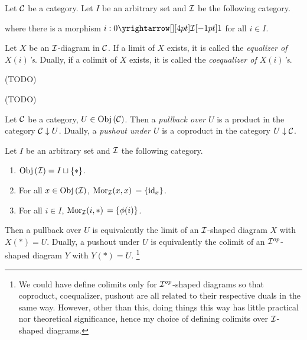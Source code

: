 \begin{dfn}[(Co)Equalizers]
  
  Let $\mathcal{C}$ be a category. 
  Let $I$ be an arbitrary set and $\mathcal{I}$ be the following category. 
  \begin{figure}[H]
    \centering
  \end{figure}
  where there is a morphism $i : \map{0}{1}{\II}{}$ for all $i \in I$. 

  Let $X$ be an $\mathcal{I}$-diagram in $\mathcal{C}$. 
  If a limit of $X$ exists, 
  it is called the \emph{equalizer of $X(i)$'s}. 
  Dually, if a colimit of $X$ exists, 
  it is called the \emph{coequalizer of $X(i)$'s}.
\end{dfn}

\begin{eg}[Equalizers]
  
  (TODO)
\end{eg}

\begin{eg}[Coequalizers]
  
  (TODO)
\end{eg}

\begin{dfn}
  
  Let $\mathcal{C}$ be a category, $U \in \mathrm{Obj}\left(\mathcal{C}\right)$.
  Then a \emph{pullback over $U$} is a product in the 
  category $\mathcal{C}\downarrow U$.
  Dually, a \emph{pushout under $U$} is a coproduct in the 
  category $U\downarrow \mathcal{C}$.

  Let $I$ be an arbitrary set and $\mathcal{I}$ the following category. 
  \begin{figure}[H]
    \centering
  \end{figure}
  \begin{enumerate}
    \item $\mathrm{Obj}\left(\mathcal{I}\right) = I \sqcup \left\{*\right\}$.
    \item For all $x \in \mathrm{Obj}\left(\mathcal{I}\right)$, $\mathrm{Mor}_{\mathcal{I}}(x, x)\, = \left\{\mathrm{id}_{x}\right\}$.
    \item For all $i \in I$, $\mathrm{Mor}_{\mathcal{I}}(i, *)\, = \left\{\phi(i)\right\}$.
  \end{enumerate}
  Then a pullback over $U$ is equivalently the limit of 
  an $\mathcal{I}$-shaped diagram $X$ with $X(*) = U$. 
  Dually, a pushout under $U$ is equivalently the colimit of 
  an $\mathcal{I}^{op}$-shaped diagram $Y$ with $Y(*) = U$.
  \footnote{
    We could have define colimits only for $\mathcal{I}^{op}$-shaped diagrams 
    so that coproduct, coequalizer, pushout are all related to
    their respective duals in the same way. 
    However, other than this, 
    doing things this way has little practical nor theoretical significance,
    hence my choice of defining colimits over $\mathcal{I}$-shaped diagrams.
  }
\end{dfn}